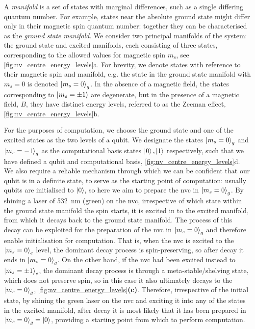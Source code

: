 A \emph{manifold} is a set of states with marginal differences, such as a single differing quantum number.
For example, states near the absolute ground state might differ only in their magnetic spin quantum number:
    together they can be characterised as the \emph{ground state manifold}. 
We consider two principal manifolds of the system:
    the ground state and excited manifolds, each consisting of 
    three states, corresponding to the allowed values for magnetic spin $m_s$, see \cref{fig:nv_centre_energy_levels}a. 
For brevity, we denote states with reference to their magnetic spin and manifold, 
    e.g. the state in the ground state manifold with $m_s=0$ is denoted $\ket{m_s=0}_g$. 
In the absence of a magnetic field, the states corresponding to $\ket{m_s=\pm1}$ are degenerate, 
    but in the presence of a magnetic field, $B$, they have distinct energy levels, 
    referred to as the Zeeman effect, \cref{fig:nv_centre_energy_levels}b. 
\par 

For the purposes of computation, 
    we choose the ground state and one of the excited states as the two levels of a qubit. 
We designate the states $\ket{m_s=0}_g$ and $\ket{m_s=-1}_g$ as the computational basis states $\ket{0}, \ket{1}$ respectively, 
    such that we have defined a qubit and computational basis, \cref{fig:nv_centre_energy_levels}d.
We also require a reliable mechanism through which we can be confident that our qubit is in a definite state, 
    to serve as the starting point of computation: 
    usually qubits are initialised to $\ket{0}$, 
    so here we aim to prepare the \gls{nvc} in $\ket{m_s=0}_g$.
By shining a laser of \SI{532}{\nano\metre} (green) on the \gls{nvc}, irrespective of which state within the ground state manifold the spin starts, 
    it is excited in to the excited manifold, from which it decays back to the ground state manifold.
The process of this decay can be exploited for the preparation of the \gls{nvc} in $\ket{m_s=0}_g$ 
    and therefore enable initialisation for computation.
That is, when the \gls{nvc} is excited to the $\ket{m_s=0}_e$ level, the dominant decay process is spin-preserving, 
    so after decay it ends in $\ket{m_s=0}_g$. 
On the other hand, if the \gls{nvc} had been excited instead to $\ket{m_s=\pm1}_e$,
    the dominant decay process is through a meta-stable/shelving state, 
    which does not preserve spin, so in this case it also ultimately decays to the $\ket{m_s=0}_g$, \cref{fig:nv_centre_energy_levels}\textbf{(c)}.
Therefore, irrespective of the initial state, 
    by shining the green laser on the \gls{nvc} and exciting it into any of the states in the excited manifold, 
    after decay it is most likely that it has been prepared in $\ket{m_s=0}_g = \ket{0}$, 
    providing a starting point from which to perform computation.
\par 

